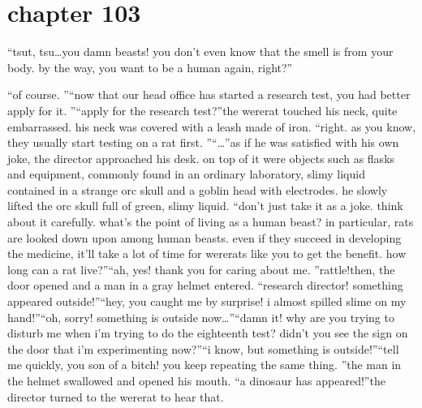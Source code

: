 \section{chapter 103}

                            “tsut, tsu…you damn beasts! you don’t even know that the smell is from your body.
 by the way, you want to be a human again, right?”




“of course.
”“now that our head office has started a research test, you had better apply for it.
”“apply for the research test?”the wererat touched his neck, quite embarrassed.
 his neck was covered with a leash made of iron.
“right.
 as you know, they usually start testing on a rat first.
”“…”as if he was satisfied with his own joke, the director approached his desk.
on top of it were objects such as flasks and equipment, commonly found in an ordinary laboratory, slimy liquid contained in a strange orc skull and a goblin head with electrodes.
he slowly lifted the orc skull full of green, slimy liquid.
“don’t just take it as a joke.
 think about it carefully.
 what’s the point of living as a human beast? in particular, rats are looked down upon among human beasts.
 even if they succeed in developing the medicine, it’ll take a lot of time for wererats like you to get the benefit.
 how long can a rat live?”“ah, yes! thank you for caring about me.
”rattle!then, the door opened and a man in a gray helmet entered.
“research director! something appeared outside!”“hey, you caught me by surprise! i almost spilled slime on my hand!”“oh, sorry! something is outside now…”“damn it! why are you trying to disturb me when i’m trying to do the eighteenth test? didn’t you see the sign on the door that i’m experimenting now?”“i know, but something is outside!”“tell me quickly, you son of a bitch! you keep repeating the same thing.
”the man in the helmet swallowed and opened his mouth.
“a dinosaur has appeared!”the director turned to the wererat to hear that.

